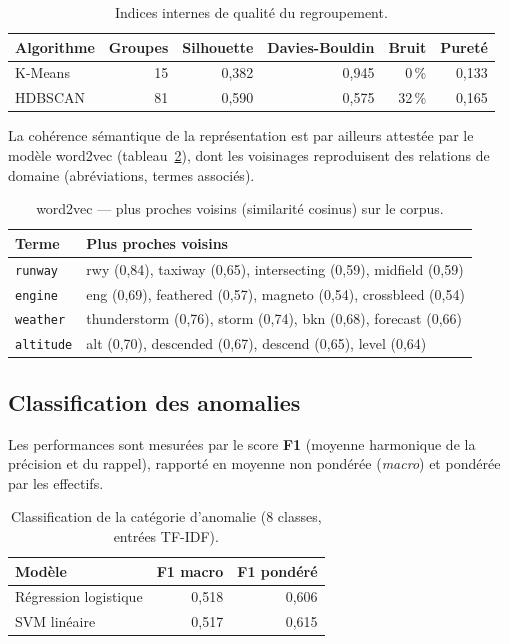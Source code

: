 \documentclass[11pt,a4paper]{article}
\begin{document}
\begin{table}[h]\centering\small
\caption{Indices internes de qualité du regroupement.}\label{tab:clust}
\begin{tabular}{lrrrrr}
\toprule
\textbf{Algorithme} & \textbf{Groupes} & \textbf{Silhouette} & \textbf{Davies-Bouldin} & \textbf{Bruit} & \textbf{Pureté} \\
\midrule
K-Means & 15 & 0,382 & 0,945 & 0\,\% & 0,133 \\
HDBSCAN & 81 & 0,590 & 0,575 & 32\,\% & 0,165 \\
\bottomrule
\end{tabular}
\end{table}

La cohérence sémantique de la représentation est par ailleurs attestée par le modèle word2vec
(tableau~\ref{tab:w2v}), dont les voisinages reproduisent des relations de domaine
(abréviations, termes associés).

\begin{table}[h]\centering\small
\caption{word2vec — plus proches voisins (similarité cosinus) sur le corpus.}\label{tab:w2v}
\begin{tabular}{ll}
\toprule
\textbf{Terme} & \textbf{Plus proches voisins} \\
\midrule
\texttt{runway}   & rwy (0,84), taxiway (0,65), intersecting (0,59), midfield (0,59) \\
\texttt{engine}   & eng (0,69), feathered (0,57), magneto (0,54), crossbleed (0,54) \\
\texttt{weather}  & thunderstorm (0,76), storm (0,74), bkn (0,68), forecast (0,66) \\
\texttt{altitude} & alt (0,70), descended (0,67), descend (0,65), level (0,64) \\
\bottomrule
\end{tabular}
\end{table}

\subsection{Classification des anomalies}
Les performances sont mesurées par le score \textbf{F1} (moyenne harmonique de la précision et
du rappel), rapporté en moyenne non pondérée (\emph{macro}) et pondérée par les effectifs.

\begin{table}[h]\centering\small
\caption{Classification de la catégorie d'anomalie (8 classes, entrées TF-IDF).}\label{tab:clf}
\begin{tabular}{lrr}
\toprule
\textbf{Modèle} & \textbf{F1 macro} & \textbf{F1 pondéré} \\
\midrule
Régression logistique & 0,518 & 0,606 \\
SVM linéaire & 0,517 & 0,615 \\
\bottomrule
\end{tabular}
\end{table}
\end{document}
